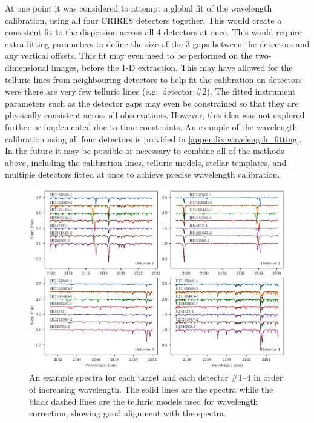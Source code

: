 At one point it was considered to attempt a global fit of the wavelength calibration, using all four {CRIRES} detectors together.
This would create a consistent fit to the dispersion across all 4 detectors at once.
This would require extra fitting parameters to define the size of the 3 gaps between the detectors and any vertical offsets.
This fit may even need to be performed on the two-dimensional images, before the 1-D extraction.
This may have allowed for the telluric lines from neighbouring detectors to help fit the calibration on detectors were there are very few telluric lines (e.g.\ detector \#2).
The fitted instrument parameters such as the detector gaps may even be constrained so that they are physically consistent across all observations.
However, this idea was not explored further or implemented due to time constraints. An example of the wavelength calibration using all four detectors is provided in \cref{appendix:wavelength_fitting}.
In the future it may be possible or necessary to combine all of the methods above, including the \thar{} calibration lines, telluric models, stellar templates, and multiple detectors fitted at once to achieve precise wavelength calibration.

\begin{figure}
    \centering
    \includegraphics[width=1\linewidth]{figures/reduction/Spectra_examples}
    \caption[Example reduced CRIRES spectra for each target.]{An example spectra for each target and each detector \#1--4 in order of increasing wavelength.
       The solid lines are the spectra while the black dashed lines are the telluric models used for wavelength correction, showing good alignment with the spectra.}
    \label{fig:spectraexamples}
\end{figure}

